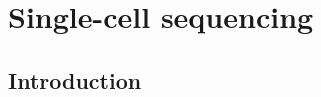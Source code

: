 \clearpage
\section{Single-cell  sequencing}  %
\label{sec:scrna}




\subsection{Introduction}
\label{sec:scrna_intro}


